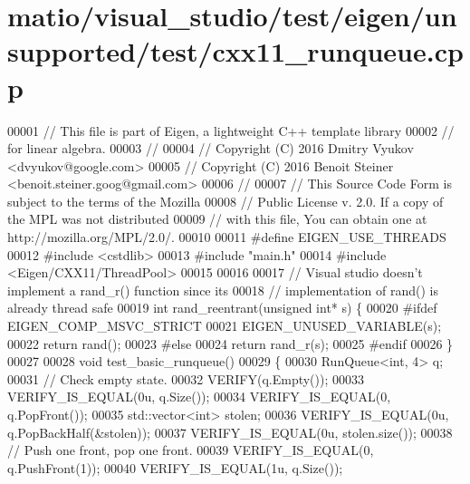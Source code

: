 \hypertarget{matio_2visual__studio_2test_2eigen_2unsupported_2test_2cxx11__runqueue_8cpp_source}{}\section{matio/visual\+\_\+studio/test/eigen/unsupported/test/cxx11\+\_\+runqueue.cpp}
\label{matio_2visual__studio_2test_2eigen_2unsupported_2test_2cxx11__runqueue_8cpp_source}

\begin{DoxyCode}
00001 \textcolor{comment}{// This file is part of Eigen, a lightweight C++ template library}
00002 \textcolor{comment}{// for linear algebra.}
00003 \textcolor{comment}{//}
00004 \textcolor{comment}{// Copyright (C) 2016 Dmitry Vyukov <dvyukov@google.com>}
00005 \textcolor{comment}{// Copyright (C) 2016 Benoit Steiner <benoit.steiner.goog@gmail.com>}
00006 \textcolor{comment}{//}
00007 \textcolor{comment}{// This Source Code Form is subject to the terms of the Mozilla}
00008 \textcolor{comment}{// Public License v. 2.0. If a copy of the MPL was not distributed}
00009 \textcolor{comment}{// with this file, You can obtain one at http://mozilla.org/MPL/2.0/.}
00010 
00011 \textcolor{preprocessor}{#define EIGEN\_USE\_THREADS}
00012 \textcolor{preprocessor}{#include <cstdlib>}
00013 \textcolor{preprocessor}{#include "main.h"}
00014 \textcolor{preprocessor}{#include <Eigen/CXX11/ThreadPool>}
00015 
00016 
00017 \textcolor{comment}{// Visual studio doesn't implement a rand\_r() function since its}
00018 \textcolor{comment}{// implementation of rand() is already thread safe}
00019 \textcolor{keywordtype}{int} rand\_reentrant(\textcolor{keywordtype}{unsigned} \textcolor{keywordtype}{int}* s) \{
00020 \textcolor{preprocessor}{#ifdef EIGEN\_COMP\_MSVC\_STRICT}
00021   EIGEN\_UNUSED\_VARIABLE(s);
00022   \textcolor{keywordflow}{return} rand();
00023 \textcolor{preprocessor}{#else}
00024   \textcolor{keywordflow}{return} rand\_r(s);
00025 \textcolor{preprocessor}{#endif}
00026 \}
00027 
00028 \textcolor{keywordtype}{void} test\_basic\_runqueue()
00029 \{
00030   RunQueue<int, 4> q;
00031   \textcolor{comment}{// Check empty state.}
00032   VERIFY(q.Empty());
00033   VERIFY\_IS\_EQUAL(0u, q.Size());
00034   VERIFY\_IS\_EQUAL(0, q.PopFront());
00035   std::vector<int> stolen;
00036   VERIFY\_IS\_EQUAL(0u, q.PopBackHalf(&stolen));
00037   VERIFY\_IS\_EQUAL(0u, stolen.size());
00038   \textcolor{comment}{// Push one front, pop one front.}
00039   VERIFY\_IS\_EQUAL(0, q.PushFront(1));
00040   VERIFY\_IS\_EQUAL(1u, q.Size());

\end{DoxyCode}
